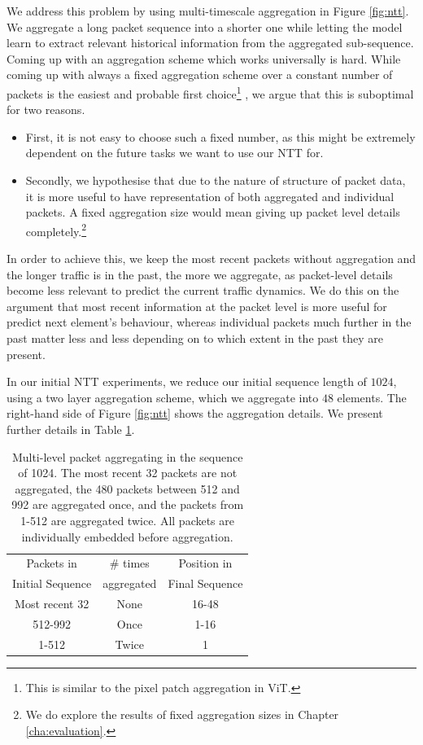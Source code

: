 We address this problem by using multi-timescale aggregation in Figure \ref{fig:ntt}. We aggregate a long packet sequence into a shorter one while letting the model learn to extract relevant historical information from the aggregated sub-sequence.
Coming up with an aggregation scheme which works universally is hard. While coming up with always a fixed aggregation scheme over a constant number of packets is the easiest and probable first choice\footnote{This is similar to the pixel patch aggregation in ViT\cite{dosovitskiyImageWorth16x162021}.}
, we argue that this is suboptimal for two reasons.
\begin{itemize}
\item First, it is not easy to choose such a fixed number, as this might be extremely dependent on the future tasks we want to use our NTT for.
\item Secondly, we hypothesise that due to the nature of structure of packet data, it is more useful to have representation of both aggregated and individual packets.  A fixed aggregation size would mean giving up packet level details completely.\footnote{We do explore the results of fixed aggregation sizes in Chapter \ref{cha:evaluation}.}
\end{itemize}
 
In order to achieve this, we keep the most recent packets without aggregation and the longer traffic is in the past, the more we aggregate, as packet-level details become less relevant to predict the current traffic dynamics. We do this on the argument that most recent information at the packet level is more useful for predict next element's behaviour, whereas individual packets much further in the past matter less and less depending on to which extent in the past they are present.


In our initial NTT experiments, we reduce our initial sequence length of $1024$, using a two layer aggregation scheme, which we aggregate into $48$ elements. The right-hand side of Figure \ref{fig:ntt} shows the aggregation details. We present further details in Table \ref{des:table1}.

\begin{table}[htbp]
\centering
\begin{tabular}{ c   c   c  }
\toprule
Packets in & \# times   & Position in \\
Initial Sequence & aggregated & Final Sequence \\
\midrule
Most recent 32 & None & 16-48 \\
512-992 & Once & 1-16 \\
1-512 & Twice & 1 \\
\bottomrule
\end{tabular}
\caption{Multi-level packet aggregating in the sequence of 1024. The most recent 32 packets are not aggregated, the 480 packets between 512 and 992 are aggregated once, and the packets from 1-512 are aggregated twice. All packets are individually embedded before aggregation.}
\label{des:table1}
\end{table}


